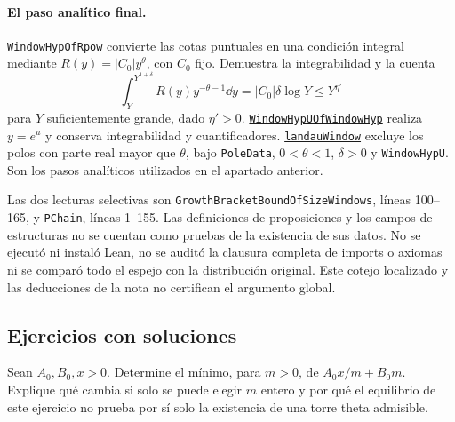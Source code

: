 \paragraph{El paso analítico final.}
\href{https://github.com/CocoSgt/riemann-hypothesis-lean/blob/7cbf7a0c32fca1badf05931879a37c3f8a2b03b4/src/Development/AutomorphicArithmetic/DedekindLFunctions/LandauTheorems/WindowHypOfRpow.lean}{\texttt{WindowHypOfRpow}} convierte las cotas puntuales
en una condición integral mediante
$R(y)=|C_0|y^\theta$, con $C_0$ fijo. Demuestra la
integrabilidad y la cuenta
\[
 \int_Y^{Y^{1+\delta}}R(y)y^{-\theta-1}\dd y
       =|C_0|\delta\log Y\le Y^{\eta'}
\]
para $Y$ suficientemente grande, dado $\eta'>0$.
\href{https://github.com/CocoSgt/riemann-hypothesis-lean/blob/7cbf7a0c32fca1badf05931879a37c3f8a2b03b4/src/Development/AutomorphicArithmetic/DedekindLFunctions/LandauTheorems/WindowHypUOfWindowHyp.lean}{\texttt{WindowHypUOfWindowHyp}} realiza $y=e^u$
y conserva integrabilidad y cuantificadores.
\href{https://github.com/CocoSgt/riemann-hypothesis-lean/blob/7cbf7a0c32fca1badf05931879a37c3f8a2b03b4/src/Development/AutomorphicArithmetic/DedekindLFunctions/LandauTheorems/landauWindow.lean}{\texttt{landauWindow}} excluye los polos con
parte real mayor que $\theta$, bajo \texttt{PoleData},
$0<\theta<1$, $\delta>0$ y \texttt{WindowHypU}.
Son los pasos analíticos utilizados en el apartado anterior.

Las dos lecturas selectivas son
\texttt{GrowthBracketBoundOfSizeWindows}, líneas 100--165,
y \texttt{PChain}, líneas 1--155. Las definiciones de
proposiciones y los campos de estructuras no se cuentan como
pruebas de la existencia de sus datos. No se ejecutó ni instaló
Lean, no se auditó la clausura completa de imports o axiomas
ni se comparó todo el espejo con la distribución original.
Este cotejo localizado y las deducciones de la nota no certifican
el argumento global.

\subsection{Ejercicios con soluciones}

\begin{ejercicio}\label{ej:par-equilibrio}
Sean $A_0,B_0,x>0$. Determine el mínimo, para $m>0$, de
$A_0x/m+B_0m$. Explique qué cambia si solo se puede elegir
$m$ entero y por qué el equilibrio de este ejercicio no prueba
por sí solo la existencia de una torre theta admisible.
\end{ejercicio}

